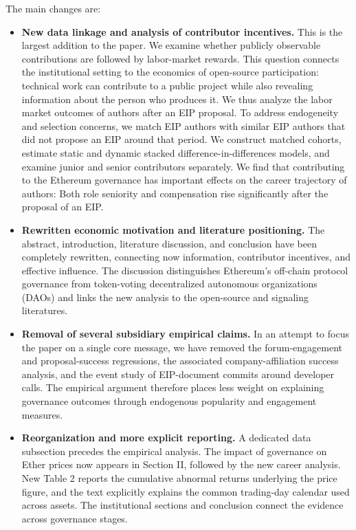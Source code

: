 \documentclass[11pt,letterpaper]{article}
\begin{document}
The main changes are:
\begin{itemize}

\item \textbf{New data linkage and analysis of contributor incentives.} This is the largest addition to the paper. We examine whether publicly observable contributions are followed by labor-market rewards. This question connects the institutional setting to the economics of open-source participation: technical work can contribute to a public project while also revealing information about the person who produces it. We thus analyze the labor market outcomes of authors after an EIP proposal. To address endogeneity and selection concerns, we match EIP authors with similar EIP authors that did not propose an EIP around that period. We construct matched cohorts, estimate static and dynamic stacked difference-in-differences models, and examine junior and senior contributors separately. We find that contributing to the Ethereum governance has important effects on the career trajectory of authors: Both role seniority and compensation rise significantly after the proposal of an EIP. 

\item \textbf{Rewritten economic motivation and literature positioning.} The abstract, introduction, literature discussion, and conclusion have been completely rewritten, connecting now  information, contributor incentives, and effective influence. The discussion distinguishes Ethereum's off-chain protocol governance from token-voting decentralized autonomous organizations (DAOs) and links the new analysis to the open-source and signaling literatures.

\item \textbf{Removal of several subsidiary empirical claims.} In an attempt to focus the paper on a single core message, we have removed the forum-engagement and proposal-success regressions, the associated company-affiliation success analysis, and the event study of EIP-document commits around developer calls. The empirical argument therefore places less weight on explaining governance outcomes through endogenous popularity and engagement measures.
\item \textbf{Reorganization and more explicit reporting.} A dedicated data subsection precedes the empirical analysis. The impact of governance on Ether prices now appears in Section II, followed by the new career analysis. New Table 2 reports the cumulative abnormal returns underlying the price figure, and the text explicitly explains the common trading-day calendar used across assets. The institutional sections and conclusion connect the evidence across governance stages.
\end{itemize}
\end{document}
